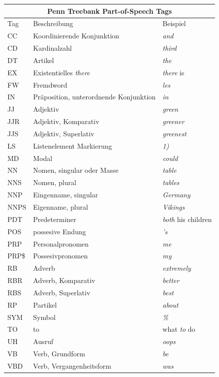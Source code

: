 \begin{table}
\begin{tabular}{ | l l l |}
	\hline
	\multicolumn{3}{|c|}{Penn Treebank Part-of-Speech Tags} \\
	\hline
	\hline
	Tag & Beschreibung & Beispiel \\
	\hline
	CC & Koordinierende Konjunktion & \textit{and} \\
	CD & Kardinalzahl & \textit{third}\\
	DT & Artikel & \textit{the}\\
	EX & Existentielles \textit{there} & \textit{there} is\\
	FW & Fremdword & \textit{les}\\
	IN & Präposition, unterordnende Konjunktion & \textit{in}\\
	JJ & Adjektiv & \textit{green}\\
	JJR & Adjektiv, Komparativ & \textit{greener}\\
	JJS & Adjektiv, Superlativ & \textit{greenest}\\
	LS & Listenelement Markierung & \textit{1)}\\
	MD & Modal & \textit{could}\\
	NN & Nomen, singular oder Masse & \textit{table}\\
	NNS & Nomen, plural & \textit{tables}\\
	NNP & Eingenname, singular & \textit{Germany}\\
	NNPS & Eigenname, plural & \textit{Vikings}\\
	PDT & Predeterminer & \textit{both} his children \\
	POS & possesive Endung & \textit{'s} \\
	PRP & Personalpronomen & \textit{me} \\
	PRP\$ & Possesivpronomen & \textit{my} \\
	RB & Adverb & \textit{extremely} \\
	RBR & Adverb, Komparativ & \textit{better} \\
	RBS & Adverb, Superlativ & \textit{best} \\
	RP & Partikel & \textit{about} \\
	SYM & Symbol & \textit{\%} \\
	TO & to & what \textit{to} do \\
	UH & Ausruf & \textit{oops} \\
	VB & Verb, Grundform & \textit{be} \\
	VBD & Verb, Vergangenheitsform & \textit{was} \\

\end{tabular}
\end{table}
